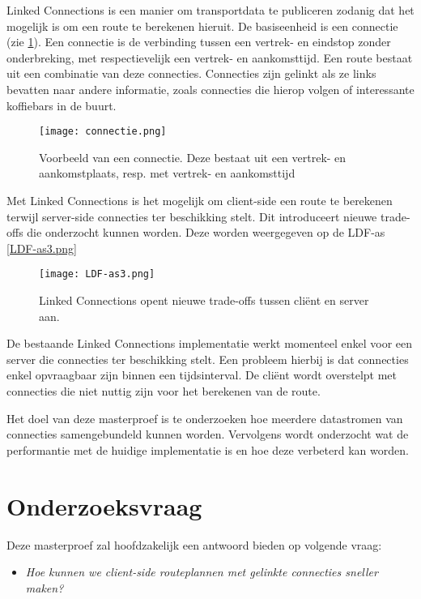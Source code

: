 Linked Connections is een manier om transportdata te publiceren zodanig dat het mogelijk is om een route te berekenen hieruit. De basiseenheid is een connectie (zie \ref{connectievb}). Een connectie is de verbinding tussen een vertrek- en eindstop zonder onderbreking, met respectievelijk een vertrek- en aankomsttijd. Een route bestaat uit een combinatie van deze connecties. Connecties zijn gelinkt als ze links bevatten naar andere informatie, zoals connecties die hierop volgen of interessante koffiebars in de buurt.

\begin{figure}[h!]
\centering
\texttt{[image: connectie.png]}
\caption{Voorbeeld van een connectie. Deze bestaat uit een vertrek- en aankomstplaats, resp. met vertrek- en aankomsttijd}
\label{connectievb}
\end{figure}

Met Linked Connections is het mogelijk om client-side een route te berekenen terwijl server-side connecties ter beschikking stelt. Dit introduceert nieuwe trade-offs die onderzocht kunnen worden. Deze worden weergegeven op de LDF-as \ref{LDF-as3.png}

 \begin{figure}[h!]
\centering
\texttt{[image: LDF-as3.png]}
\caption{Linked Connections opent nieuwe trade-offs tussen cli\"ent en server aan.}
\label{probleemrouteplanning}
\end{figure}


De bestaande Linked Connections implementatie werkt momenteel enkel voor een server die connecties ter beschikking stelt. Een probleem hierbij is dat connecties enkel opvraagbaar zijn binnen een tijdsinterval. De cli\"ent wordt overstelpt met connecties die niet nuttig zijn voor het berekenen van de route.

Het doel van deze masterproef is te onderzoeken hoe meerdere datastromen van connecties samengebundeld kunnen worden. Vervolgens wordt onderzocht wat de performantie met de huidige implementatie is en hoe deze verbeterd kan worden.

\section{Onderzoeksvraag}

Deze masterproef zal hoofdzakelijk een antwoord bieden op volgende vraag:
\begin{itemize}
\item \emph{Hoe kunnen we client-side routeplannen met gelinkte connecties sneller maken?}
\end{itemize}

